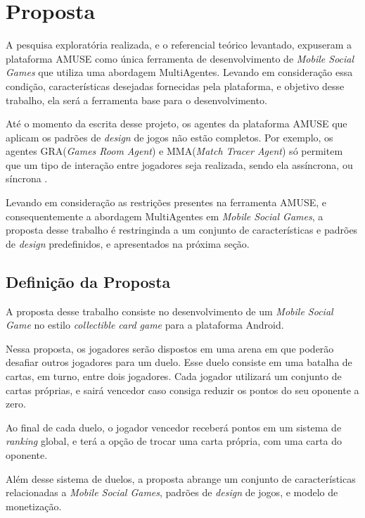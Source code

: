 \chapter[Proposta]{Proposta}
\label{chapter:proposta}

A pesquisa exploratória realizada, e o referencial teórico levantado,
expuseram  a plataforma AMUSE como única ferramenta de desenvolvimento de
\textit{Mobile Social Games} que utiliza uma abordagem MultiAgentes. Levando em
consideração essa condição, características desejadas fornecidas pela
plataforma, e objetivo desse trabalho, ela será a ferramenta base para o
desenvolvimento.

Até o momento da escrita desse projeto, os agentes da plataforma AMUSE que
aplicam os padrões de \textit{design} de jogos não estão completos.
Por exemplo, os agentes GRA(\textit{Games Room Agent}) e MMA(\textit{Match
Tracer Agent}) só permitem que um tipo de interação entre jogadores seja
realizada, sendo ela assíncrona, ou síncrona \cite{bergenti2013}.

Levando em consideração as restrições presentes na ferramenta AMUSE, e
consequentemente a abordagem MultiAgentes em \textit{Mobile Social Games}, a
proposta desse trabalho é restringinda a um conjunto de características e
padrões de \textit{design} predefinidos, e apresentados na próxima seção.

\section{Definição da Proposta}

A proposta desse trabalho consiste no desenvolvimento de um \textit{Mobile
Social Game} no estilo \textit{collectible card game} para a plataforma
Android.

Nessa proposta, os jogadores serão dispostos em uma arena em que
poderão desafiar outros jogadores para um duelo. Esse duelo consiste em uma
batalha de cartas, em turno, entre dois jogadores. Cada jogador utilizará um
conjunto de cartas próprias, e sairá vencedor caso consiga reduzir os
pontos do seu oponente a zero.

Ao final de cada duelo, o jogador vencedor receberá pontos em um sistema de
\textit{ranking} global, e terá a opção de trocar uma carta própria, com uma
carta do oponente.

Além desse sistema de duelos, a proposta abrange um conjunto de características
relacionadas a \textit{Mobile Social Games}, padrões de \textit{design} de
jogos, e modelo de monetização.

